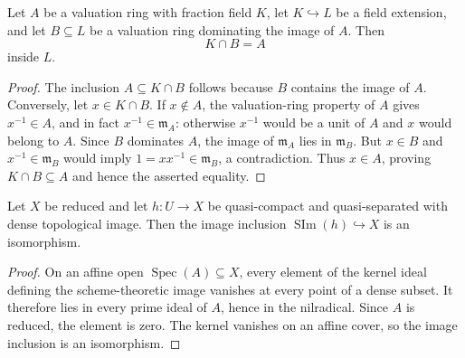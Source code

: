 \begin{lemma}
  \label{lemma:nagata-valuation-intersection}
  \leanok

  Let \(A\) be a valuation ring with fraction field \(K\), let
  \(K\hookrightarrow L\) be a field extension, and let \(B\subseteq L\) be a
  valuation ring dominating the image of \(A\).  Then
  \[
    K\cap B=A
  \]
  inside \(L\).
\end{lemma}

\begin{proof}
  \leanok
  The inclusion \(A\subseteq K\cap B\) follows because $B$ contains the image
  of $A$.  Conversely, let $x\in K\cap B$.  If $x\notin A$, the valuation-ring
  property of $A$ gives $x^{-1}\in A$, and in fact
  $x^{-1}\in\mathfrak m_A$: otherwise $x^{-1}$ would be a unit of $A$ and
  $x$ would belong to $A$.  Since $B$ dominates $A$, the image of
  $\mathfrak m_A$ lies in $\mathfrak m_B$.  But $x\in B$ and
  $x^{-1}\in\mathfrak m_B$ would imply
  $1=xx^{-1}\in\mathfrak m_B$, a contradiction.  Thus $x\in A$, proving
  $K\cap B\subseteq A$ and hence the asserted equality.
\end{proof}

\begin{lemma}
  \label{lemma:nagata-reduced-dense-image-schematic}
  \leanok

  Let $X$ be reduced and let $h\colon U\to X$ be quasi-compact and
  quasi-separated with dense topological image.  Then the image inclusion
  $\operatorname{SIm}(h)\hookrightarrow X$ is an isomorphism.
\end{lemma}

\begin{proof}
  \leanok
  On an affine open $\operatorname{Spec}(A)\subseteq X$, every element of the
  kernel ideal defining the scheme-theoretic image vanishes at every point of
  a dense subset.  It therefore lies in every prime ideal of $A$, hence in
  the nilradical.  Since $A$ is reduced, the element is zero.  The kernel
  vanishes on an affine cover, so the image inclusion is an isomorphism.
\end{proof}

